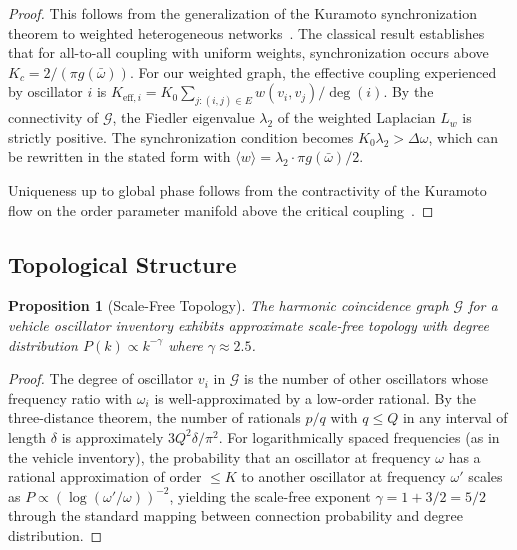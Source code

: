 \documentclass[twocolumn,10pt]{article}
\newtheorem{proposition}[theorem]{Proposition}
\theoremstyle{definition}
\theoremstyle{remark}
\newcommand{\Gcal}{\mathcal{G}}
\begin{document}
\begin{proof}
This follows from the generalization of the Kuramoto
synchronization theorem to weighted heterogeneous
networks~\cite{kuramoto1984,strogatz2000}. The classical result establishes
that for all-to-all coupling with uniform weights, synchronization occurs
above $K_c = 2/(\pi g(\bar{\omega}))$. For our weighted graph, the
effective coupling experienced by oscillator $i$ is $K_{\mathrm{eff},i} =
K_0 \sum_{j: (i,j) \in E} w(v_i, v_j) / \deg(i)$. By the connectivity
of $\Gcal$, the Fiedler eigenvalue $\lambda_2$ of the weighted Laplacian
$L_w$ is strictly positive. The synchronization condition becomes $K_0
\lambda_2 > \Delta \omega$, which can be rewritten in the stated form with
$\langle w \rangle = \lambda_2 \cdot \pi g(\bar{\omega}) / 2$.

Uniqueness up to global phase follows from the contractivity of the
Kuramoto flow on the order parameter manifold above the critical
coupling~\cite{strogatz2000}.
\end{proof}

\subsection{Topological Structure}

\begin{proposition}[Scale-Free Topology]\label{prop:scale-free}
The harmonic coincidence graph $\Gcal$ for a vehicle oscillator inventory
exhibits approximate scale-free topology with degree distribution
$P(k) \propto k^{-\gamma}$ where $\gamma \approx 2.5$.
\end{proposition}

\begin{proof}
The degree of oscillator $v_i$ in $\Gcal$ is the number of other
oscillators whose frequency ratio with $\omega_i$ is well-approximated by
a low-order rational. By the three-distance
theorem, the number of rationals $p/q$ with $q \leq Q$ in any interval
of length $\delta$ is approximately $3Q^2 \delta / \pi^2$. For logarithmically
spaced frequencies (as in the vehicle inventory), the probability that an
oscillator at frequency $\omega$ has a rational approximation of order
$\leq K$ to another oscillator at frequency $\omega'$ scales as
$P \propto (\log(\omega'/\omega))^{-2}$, yielding the scale-free exponent
$\gamma = 1 + 3/2 = 5/2$ through the standard mapping between connection
probability and degree distribution.
\end{proof}
\end{document}
